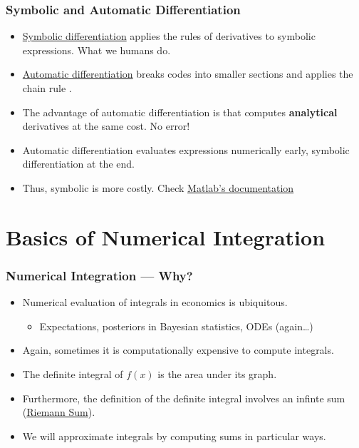 \documentclass[11pt,xcolor={svgnames},aspectratio=169,usepdftitle=false]{beamer}
\begin{document}
\begin{frame}
  \frametitle{Symbolic and Automatic Differentiation}
\begin{itemize}
  \item \href{https://www.mathworks.com/help/symbolic/diff.html\#btwol6i-2}{Symbolic differentiation} applies the rules of derivatives to symbolic expressions. What we humans do.
  \item \href{https://en.wikipedia.org/wiki/Automatic_differentiation}{Automatic differentiation} breaks codes into smaller sections and applies the chain rule \parencite[See Chapter~4]{kwon2019julia}.
  \item The advantage of automatic differentiation is that computes \alert{\textbf{analytical}} derivatives at the same cost. No error!
  \item Automatic differentiation evaluates expressions numerically early, symbolic differentiation at the end.
  \item Thus, symbolic is more costly. Check \href{https://www.mathworks.com/help/deeplearning/ug/deep-learning-with-automatic-differentiation-in-matlab.html}{Matlab's documentation}
\end{itemize}
\end{frame}

\section{Basics of Numerical Integration}

\begin{frame}
  \frametitle{Numerical Integration --- Why?}
\begin{itemize}
  \item Numerical evaluation of integrals in economics is ubiquitous.
  \begin{itemize}
    \item Expectations, posteriors in Bayesian statistics, ODEs (again\ldots)
  \end{itemize}
  \item Again, sometimes it is computationally expensive to compute integrals.
  \item The definite integral of $f(x)$ is the area under its graph.
  \item Furthermore, the definition of the definite integral involves an infinte sum (\href{https://en.wikipedia.org/wiki/Riemann_sum}{Riemann Sum}).
  \item We will approximate integrals by computing sums in particular ways.
\end{itemize}
\end{frame}
\end{document}
